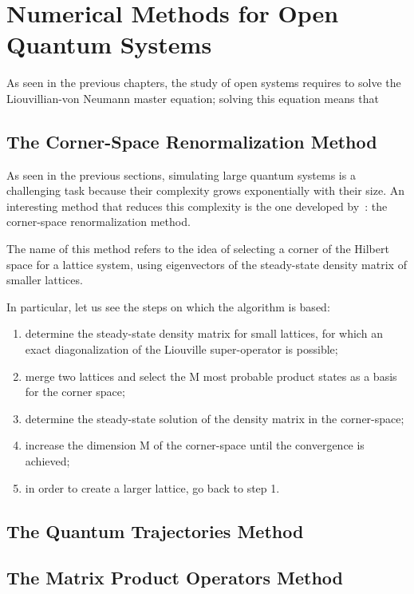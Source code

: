 \chapter{Numerical Methods for Open Quantum Systems}
As seen in the previous chapters, the study of open systems requires to solve the Liouvillian-von Neumann master equation; solving this equation means that 

\section{The Corner-Space Renormalization Method}
As seen in the previous sections, simulating large quantum systems is a challenging task because their complexity grows exponentially with their size. An interesting method that reduces this complexity is the one developed by~\cite{PhysRevLett.115.080604}: the corner-space renormalization method. 

The name of this method refers to the idea of selecting a corner of the Hilbert space for a lattice system, using eigenvectors of the steady-state density matrix of smaller lattices. 

In particular, let us see the steps on which the algorithm is based: 
\begin{enumerate}
\item determine the steady-state density matrix for small lattices, for which an exact diagonalization of the Liouville super-operator is possible;
\item merge two lattices and select the M most probable product states as a basis for the corner space;
\item determine the steady-state solution of the density matrix in the corner-space;
\item increase the dimension M of the corner-space until the convergence is achieved;
\item in order to create a larger lattice, go back to step 1.
\end{enumerate}

\section{The Quantum Trajectories Method}
\section{The Matrix Product Operators Method}
